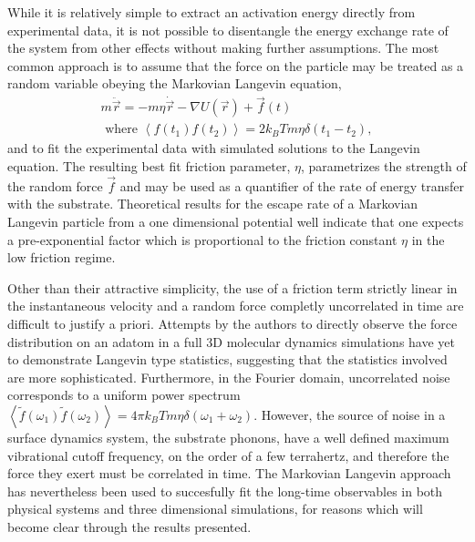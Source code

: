 \documentclass[7pt]{article}
\begin{document}
While it is relatively simple to extract an activation energy directly from experimental data\cite{Diamant,Alexandrowicz2006}, it is not possible to disentangle the energy exchange rate of the system from other effects without making further assumptions. The most common approach is to assume that the force on the particle may be treated as a random variable obeying the Markovian Langevin equation,
\begin{equation}
\begin{gathered}
	m\ddot{\vec{r}}=-m\eta\dot{\vec{r}}-\nabla U(\vec{r})+\vec{f}(t) \\ 
	\text{ where } \left<f(t_1)f(t_2)\right>=2k_BTm\eta\delta(t_1-t_2),
\end{gathered}
	\label{eq:langevin}
\end{equation}
and to fit the experimental data with simulated solutions to the Langevin equation. The resulting best fit friction parameter, $\eta$, parametrizes the strength of the random force $\vec{f}$ and may be used as a quantifier of the rate of energy transfer with the substrate. Theoretical results for the escape rate of a Markovian Langevin particle from a one dimensional potential well indicate that one expects a pre-exponential factor which is proportional to the friction constant $\eta$ in the low friction regime\cite{Kramers, Zwanzig}. 

Other than their attractive simplicity, the use of a friction term strictly linear in the instantaneous velocity and a random force completly uncorrelated in time are difficult to justify a priori. Attempts by the authors to directly observe the force distribution on an adatom in a full 3D molecular dynamics simulations have yet to demonstrate Langevin type statistics, suggesting that the statistics involved are more sophisticated. Furthermore, in the Fourier domain, uncorrelated noise corresponds to a uniform power spectrum $\left<\tilde{f}(\omega_1)\tilde{f}(\omega_2)\right>=4\pi k_BTm\eta\delta(\omega_1+\omega_2)$. However, the source of noise in a surface dynamics system, the substrate phonons, have a well defined maximum vibrational cutoff frequency, on the order of a few terrahertz, and therefore the force they exert must be correlated in time\cite{Sinha}. The Markovian Langevin approach has nevertheless been used to succesfully fit the long-time observables in both physical systems\cite{} and three dimensional simulations\cite{Diamant}, for reasons which will become clear through the results presented. 
\end{document}

